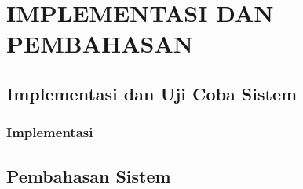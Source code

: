 \chapter{IMPLEMENTASI DAN PEMBAHASAN}
\section{Implementasi dan Uji Coba Sistem}

\subsection{Implementasi}

\section{Pembahasan Sistem}
